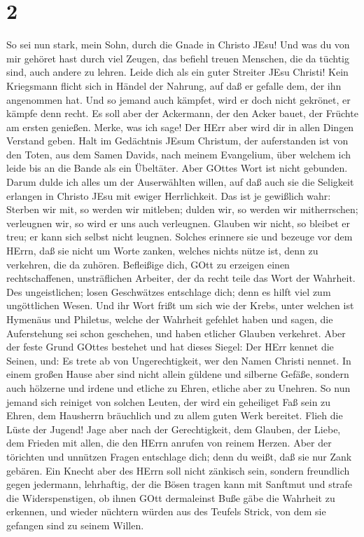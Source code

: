 \hypertarget{section-1}{%
\section{2}\label{section-1}}

 So sei nun stark, mein Sohn, durch die Gnade in Christo
JEsu!  Und was du von mir gehöret hast durch viel Zeugen,
das befiehl treuen Menschen, die da tüchtig sind, auch andere zu lehren.
 Leide dich als ein guter Streiter JEsu Christi!
 Kein Kriegsmann flicht sich in Händel der Nahrung, auf daß
er gefalle dem, der ihn angenommen hat.  Und so jemand auch
kämpfet, wird er doch nicht gekrönet, er kämpfe denn recht. 
Es soll aber der Ackermann, der den Acker bauet, der Früchte am ersten
genießen. Merke, was ich sage!  Der HErr aber wird dir in
allen Dingen Verstand geben.  Halt im Gedächtnis JEsum
Christum, der auferstanden ist von den Toten, aus dem Samen Davids, nach
meinem Evangelium,  über welchem ich leide bis an die Bande
als ein Übeltäter. Aber GOttes Wort ist nicht gebunden. 
Darum dulde ich alles um der Auserwählten willen, auf daß auch sie die
Seligkeit erlangen in Christo JEsu mit ewiger Herrlichkeit.
 Das ist je gewißlich wahr: Sterben wir mit, so werden wir
mitleben;  dulden wir, so werden wir mitherrschen;
verleugnen wir, so wird er uns auch verleugnen.  Glauben
wir nicht, so bleibet er treu; er kann sich selbst nicht leugnen.
 Solches erinnere sie und bezeuge vor dem HErrn, daß sie
nicht um Worte zanken, welches nichts nütze ist, denn zu verkehren, die
da zuhören.  Befleißige dich, GOtt zu erzeigen einen
rechtschaffenen, unsträflichen Arbeiter, der da recht teile das Wort der
Wahrheit.  Des ungeistlichen; losen Geschwätzes entschlage
dich; denn es hilft viel zum ungöttlichen Wesen.  Und ihr
Wort frißt um sich wie der Krebs, unter welchen ist Hymenäus und
Philetus,  welche der Wahrheit gefehlet haben und sagen,
die Auferstehung sei schon geschehen, und haben etlicher Glauben
verkehret.  Aber der feste Grund GOttes bestehet und hat
dieses Siegel: Der HErr kennet die Seinen, und: Es trete ab von
Ungerechtigkeit, wer den Namen Christi nennet.  In einem
großen Hause aber sind nicht allein güldene und silberne Gefäße, sondern
auch hölzerne und irdene und etliche zu Ehren, etliche aber zu Unehren.
 So nun jemand sich reiniget von solchen Leuten, der wird
ein geheiliget Faß sein zu Ehren, dem Hausherrn bräuchlich und zu allem
guten Werk bereitet.  Flieh die Lüste der Jugend! Jage aber
nach der Gerechtigkeit, dem Glauben, der Liebe, dem Frieden mit allen,
die den HErrn anrufen von reinem Herzen.  Aber der
törichten und unnützen Fragen entschlage dich; denn du weißt, daß sie
nur Zank gebären.  Ein Knecht aber des HErrn soll nicht
zänkisch sein, sondern freundlich gegen jedermann, lehrhaftig, der die
Bösen tragen kann mit Sanftmut  und strafe die
Widerspenstigen, ob ihnen GOtt dermaleinst Buße gäbe die Wahrheit zu
erkennen,  und wieder nüchtern würden aus des Teufels
Strick, von dem sie gefangen sind zu seinem Willen.

